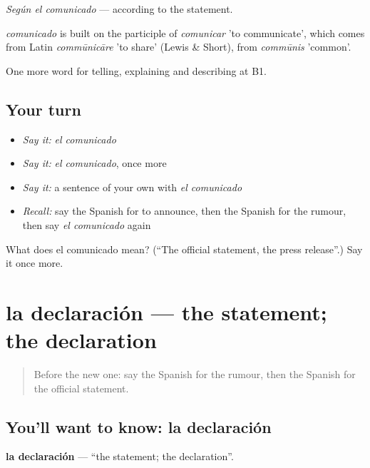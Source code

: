 \emph{Según el comunicado} — according to the statement.

\begin{cousinweb}
\emph{comunicado} is built on the participle of \emph{comunicar} 'to communicate', which comes from Latin \emph{commūnicāre} 'to share' (Lewis \& Short), from \emph{commūnis} 'common'.
\end{cousinweb}

\begin{grammarlens}[title={What you've built}]
One more word for telling, explaining and describing at B1.
\end{grammarlens}

\subsection*{Your turn}
\begin{itemize}
\raggedright
  \item \emph{Say it:} \emph{el comunicado}
  \item \emph{Say it:} \emph{el comunicado}, once more
  \item \emph{Say it:} a sentence of your own with \emph{el comunicado}
  \item \emph{Recall:} say the Spanish for to announce, then the Spanish for the rumour, then say \emph{el comunicado} again
\end{itemize}

\begin{tcolorbox}[breakable,colback=teal!4,colframe=teal!35!black,title={Before you move on}]
What does el comunicado mean? (\textquotedblleft{}The official statement, the press release\textquotedblright{}.) Say it once more.
\end{tcolorbox}
\section[la declaración]{la declaración — the statement; the declaration}

\label{lesson:ES-C515-declaracion}



\begin{quote}
Before the new one: say the Spanish for the rumour, then the Spanish for the official statement.
\end{quote}

\subsection*{You'll want to know: la declaración}
\textbf{la declaración} — \textquotedblleft{}the statement; the declaration\textquotedblright{}.

